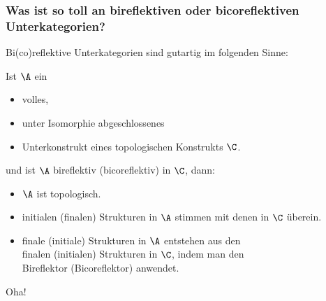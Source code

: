 \begin{frame}
  \frametitle{Was ist so toll an bireflektiven oder bicoreflektiven Unterkategorien?} 

\pause
  Bi(co)reflektive Unterkategorien sind gutartig im folgenden Sinne:
\pause

\begin{thm*}
  Ist $\A$ ein 
\begin{itemize}
\item volles,
\item unter Isomorphie abgeschlossenes
\item Unterkonstrukt eines topologischen Konstrukts $\C$.
\end{itemize}

\vspace{1em}
\pause
  und ist $\A$ bireflektiv (bicoreflektiv) in $\C$, dann:

\begin{itemize}
  \item<+-> $\A$ ist topologisch.
\item<+-> initialen (finalen) Strukturen in $\A$ stimmen mit denen in $\C$ überein.
\item<+-> finale (initiale) Strukturen in $\A$ entstehen aus den \\
finalen (initialen) Strukturen in $\C$, indem man den \\Bireflektor (Bicoreflektor) anwendet.
\end{itemize}
\end{thm*}

\pause
\vspace{1em}
\huge{Oha!}

\end{frame}

